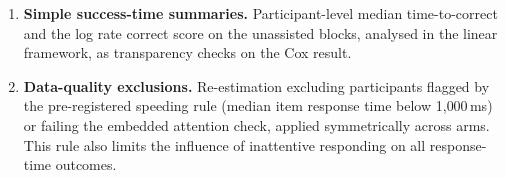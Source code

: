 \begin{enumerate}
    \item \textbf{Simple success-time summaries.} Participant-level median time-to-correct and the log rate correct score on the unassisted blocks, analysed in the linear framework, as transparency checks on the Cox result.
    \item \textbf{Data-quality exclusions.} Re-estimation excluding participants flagged by the pre-registered speeding rule (median item response time below 1{,}000\,ms) or failing the embedded attention check, applied symmetrically across arms. This rule also limits the influence of inattentive responding on all response-time outcomes.
\end{enumerate}
